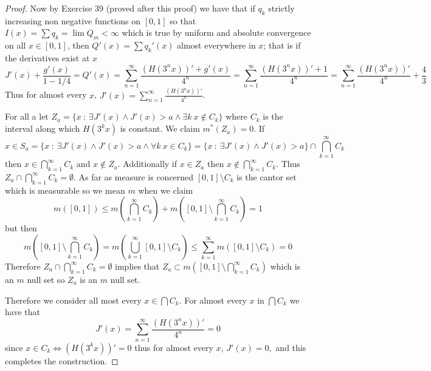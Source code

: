 \documentclass[11pt]{amsart}
\theoremstyle{definition}
\numberwithin{theorem}{section}
\numberwithin{definition}{section}
\numberwithin{equation}{section}
\begin{document}
\begin{proof}
	Now by Exercise 39 (proved after this proof) we have that if $q_k$  strictly increasing non negative functions on $[0,1]$ so that $I(x) = \sum q_k = \lim Q_m < \infty$ which is true by uniform and absolute convergence on all $x \in [0,1]$, then $Q'(x) = \sum q_k'(x)$ almost everywhere in $x$; that is if the derivatives exist at $x$
	\begin{equation*}
		J'(x) + \frac{g'(x)}{1-1/4} = Q'(x) = \sum_{n=1}^\infty \frac{\left(H(3^nx)\right)' + g'(x)}{4^n} =   \sum_{n=1}^\infty \frac{\left(H(3^nx)\right)' + 1}{4^n}  =  \sum_{n=1}^\infty \frac{\left(H(3^nx)\right)'}{4^n} + \frac{4}{3}
	 \end{equation*} 
	 Thus for almost every $x$, $J'(x) = \sum_{n=1}^\infty \frac{\left(H(3^nx)\right)'}{4^n}$.

	 For all a let $Z_a = \{x\ :\ \exists J'(x)\wedge J'(x) > a \wedge \exists k\ x \notin C_k\}$ where $C_k$ is the interval along which $H(3^kx)$ is constant. We claim $m^*(Z_a) = 0$. If $$x \in S_a  = \{x\ :\ \exists J'(x)\wedge J'(x) > a \wedge \forall k\ x \in C_k\} =  \{x\ :\ \exists J'(x)\wedge J'(x) > a\} \cap \bigcap_{k=1}^\infty C_k$$
	 then $x \in \bigcap_{k=1}^\infty C_k$ and $x \notin Z_a$. Additionally if $x \in Z_a$ then $x \notin \bigcap_{k=1}^\infty C_k$. Thus $Z_a \cap  \bigcap_{k=1}^\infty C_k = \emptyset$. As far as measure is concerned $[0,1] \setminus C_k$ is the cantor set which is measurable so we mean $m$ when we claim
	 \begin{equation*}
	 	m([0,1]) \leq m\left(\bigcap_{k=1}^\infty C_k \right) + m\left([0,1] \setminus \bigcap_{k=1}^\infty C_k\right) = 1
	 \end{equation*}
	 but then \begin{equation*}
	 	 m\left([0,1] \setminus \bigcap_{k=1}^\infty C_k\right) =  m\left( \bigcup_{k=1}^\infty [0,1] \setminus C_k\right) \leq \sum_{k=1}^\infty m([0,1] \setminus C_k) = 0
	 \end{equation*}
	 Therefore  $Z_a \cap  \bigcap_{k=1}^\infty C_k = \emptyset$ implies that $Z_a \subset m\left([0,1] \setminus \bigcap_{k=1}^\infty C_k\right)$ which is an $m$ null set so $Z_a$ is an $m$ null set.

	 Therefore we consider all most every $x \in \bigcap C_k$. For almost every $x$ in $\bigcap C_k$ we have
	 that $$J'(x) = \sum_{n=1}^\infty \frac{\left(H(3^nx)\right)'}{4^n} = 0$$
	 since $x \in C_k \iff (H(3^kx))' = 0$ thus for almost every $x$, $J'(x) = 0,$ and this completes the construction.


\end{proof}
\end{document}
